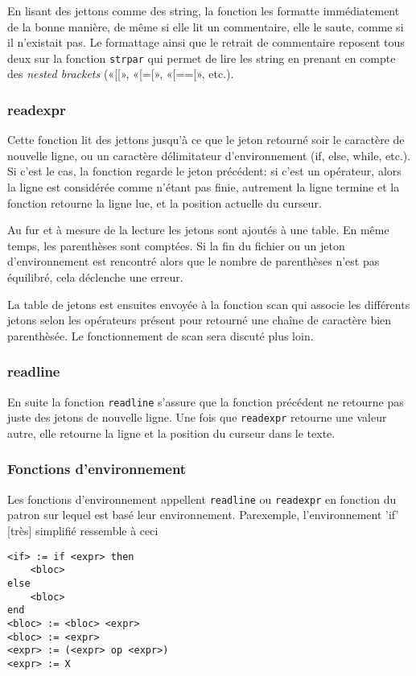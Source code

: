 \documentclass{article}
\begin{document}
En lisant des jettons comme des string, la fonction les formatte immédiatement de la bonne manière, de même si elle lit un commentaire, elle le saute, comme si il n'existait pas. Le formattage ainsi que le retrait de commentaire reposent tous deux sur la fonction \texttt{strpar} qui permet de lire les string en prenant en compte des \textit{nested brackets} («[[», «[=[», «[==[», etc.).

\subsubsection{readexpr}
Cette fonction lit des jettons jusqu'à ce que le jeton retourné soir le caractère de nouvelle ligne, ou un caractère délimitateur d'environnement (if, else, while, etc.). Si c'est le cas, la fonction regarde le jeton précédent: si c'est un opérateur, alors la ligne est considérée comme n'étant pas finie, autrement la ligne termine et la fonction retourne la ligne lue, et la position actuelle du curseur.

Au fur et à mesure de la lecture les jetons sont ajoutés à une table. En même temps, les parenthèses sont comptées. Si la fin du fichier ou un jeton d'environnement est rencontré alors que le nombre de parenthèses n'est pas équilibré, cela déclenche une erreur.

La table de jetons est ensuites envoyée à la fonction scan qui associe les différents jetons selon les opérateurs présent pour retourné une chaîne de caractère bien parenthèsée. Le fonctionnement de scan sera discuté plus loin.
            
\subsubsection{readline}
En suite la fonction \texttt{readline} s'assure que la fonction précédent ne retourne pas juste des jetons de nouvelle ligne. Une fois que \texttt{readexpr} retourne une valeur autre, elle retourne la ligne et la position du curseur dans le texte.

\subsubsection{Fonctions d'environnement}
Les fonctions d'environnement appellent \texttt{readline} ou \texttt{readexpr} en fonction du patron sur lequel est basé leur environnement. Parexemple, l'environnement 'if' [très] simplifié ressemble à ceci
\begin{lstlisting}[style=out]
<if> := if <expr> then
	<bloc>
else
	<bloc>
end
<bloc> := <bloc> <expr>
<bloc> := <expr>
<expr> := (<expr> op <expr>)
<expr> := X
\end{lstlisting}
\end{document}
